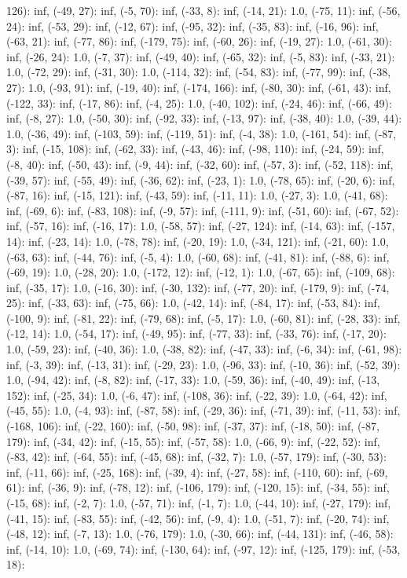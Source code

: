 \documentclass[parskip=half]{scrartcl}
\begin{document}
126): inf, (-49, 27): inf, (-5, 70): inf, (-33, 8): inf, (-14, 21): 1.0, (-75, 11): inf, (-56, 24): inf, (-53, 29): inf, (-12, 67): inf, (-95, 32): inf, (-35, 83): inf, (-16, 96): inf, (-63, 21): inf, (-77, 86): inf, (-179, 75): inf, (-60, 26): inf, (-19, 27): 1.0, (-61, 30): inf, (-26, 24): 1.0, (-7, 37): inf, (-49, 40): inf, (-65, 32): inf, (-5, 83): inf, (-33, 21): 1.0, (-72, 29): inf, (-31, 30): 1.0, (-114, 32): inf, (-54, 83): inf, (-77, 99): inf, (-38, 27): 1.0, (-93, 91): inf, (-19, 40): inf, (-174, 166): inf, (-80, 30): inf, (-61, 43): inf, (-122, 33): inf, (-17, 86): inf, (-4, 25): 1.0, (-40, 102): inf, (-24, 46): inf, (-66, 49): inf, (-8, 27): 1.0, (-50, 30): inf, (-92, 33): inf, (-13, 97): inf, (-38, 40): 1.0, (-39, 44): 1.0, (-36, 49): inf, (-103, 59): inf, (-119, 51): inf, (-4, 38): 1.0, (-161, 54): inf, (-87, 3): inf, (-15, 108): inf, (-62, 33): inf, (-43, 46): inf, (-98, 110): inf, (-24, 59): inf, (-8, 40): inf, (-50, 43): inf, (-9, 44): inf, (-32, 60): inf, (-57, 3): inf, (-52, 118): inf, (-39, 57): inf, (-55, 49): inf, (-36, 62): inf, (-23, 1): 1.0, (-78, 65): inf, (-20, 6): inf, (-87, 16): inf, (-15, 121): inf, (-43, 59): inf, (-11, 11): 1.0, (-27, 3): 1.0, (-41, 68): inf, (-69, 6): inf, (-83, 108): inf, (-9, 57): inf, (-111, 9): inf, (-51, 60): inf, (-67, 52): inf, (-57, 16): inf, (-16, 17): 1.0, (-58, 57): inf, (-27, 124): inf, (-14, 63): inf, (-157, 14): inf, (-23, 14): 1.0, (-78, 78): inf, (-20, 19): 1.0, (-34, 121): inf, (-21, 60): 1.0, (-63, 63): inf, (-44, 76): inf, (-5, 4): 1.0, (-60, 68): inf, (-41, 81): inf, (-88, 6): inf, (-69, 19): 1.0, (-28, 20): 1.0, (-172, 12): inf, (-12, 1): 1.0, (-67, 65): inf, (-109, 68): inf, (-35, 17): 1.0, (-16, 30): inf, (-30, 132): inf, (-77, 20): inf, (-179, 9): inf, (-74, 25): inf, (-33, 63): inf, (-75, 66): 1.0, (-42, 14): inf, (-84, 17): inf, (-53, 84): inf, (-100, 9): inf, (-81, 22): inf, (-79, 68): inf, (-5, 17): 1.0, (-60, 81): inf, (-28, 33): inf, (-12, 14): 1.0, (-54, 17): inf, (-49, 95): inf, (-77, 33): inf, (-33, 76): inf, (-17, 20): 1.0, (-59, 23): inf, (-40, 36): 1.0, (-38, 82): inf, (-47, 33): inf, (-6, 34): inf, (-61, 98): inf, (-3, 39): inf, (-13, 31): inf, (-29, 23): 1.0, (-96, 33): inf, (-10, 36): inf, (-52, 39): 1.0, (-94, 42): inf, (-8, 82): inf, (-17, 33): 1.0, (-59, 36): inf, (-40, 49): inf, (-13, 152): inf, (-25, 34): 1.0, (-6, 47): inf, (-108, 36): inf, (-22, 39): 1.0, (-64, 42): inf, (-45, 55): 1.0, (-4, 93): inf, (-87, 58): inf, (-29, 36): inf, (-71, 39): inf, (-11, 53): inf, (-168, 106): inf, (-22, 160): inf, (-50, 98): inf, (-37, 37): inf, (-18, 50): inf, (-87, 179): inf, (-34, 42): inf, (-15, 55): inf, (-57, 58): 1.0, (-66, 9): inf, (-22, 52): inf, (-83, 42): inf, (-64, 55): inf, (-45, 68): inf, (-32, 7): 1.0, (-57, 179): inf, (-30, 53): inf, (-11, 66): inf, (-25, 168): inf, (-39, 4): inf, (-27, 58): inf, (-110, 60): inf, (-69, 61): inf, (-36, 9): inf, (-78, 12): inf, (-106, 179): inf, (-120, 15): inf, (-34, 55): inf, (-15, 68): inf, (-2, 7): 1.0, (-57, 71): inf, (-1, 7): 1.0, (-44, 10): inf, (-27, 179): inf, (-41, 15): inf, (-83, 55): inf, (-42, 56): inf, (-9, 4): 1.0, (-51, 7): inf, (-20, 74): inf, (-48, 12): inf, (-7, 13): 1.0, (-76, 179): 1.0, (-30, 66): inf, (-44, 131): inf, (-46, 58): inf, (-14, 10): 1.0, (-69, 74): inf, (-130, 64): inf, (-97, 12): inf, (-125, 179): inf, (-53, 18): 
\end{document}
